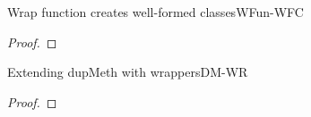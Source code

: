 \documentclass[acmlarge, anonymous, authordraft, review]{acmart} %
\begin{document}
\begin{theorem}{Wrap function creates well-formed classes}{WFun-WFC}
\begin{proof}
%     
    \end{proof}
   \end{theorem}

\begin{lemma}{Extending dupMeth with wrappers}{DM-WR}

  \begin{conds}
   \cond{\cload{\classoff\C\K}}
  \end{conds}
  
  \then\axiom{\cload{\classoff\D{\K~\k}}}

   \begin{proof} 
   \end{proof}
\end{lemma}
 
\end{document}
